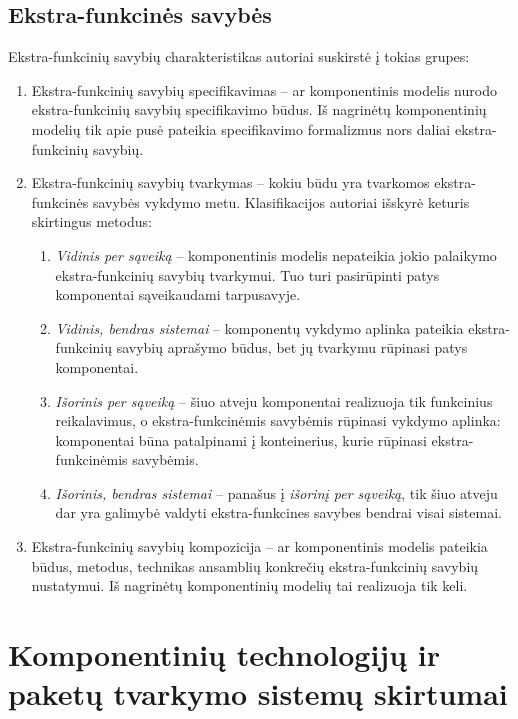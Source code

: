 \subsection{Ekstra-funkcinės savybės}

Ekstra-funkcinių savybių charakteristikas autoriai suskirstė į tokias
grupes:
\begin{enumerate}
  \item Ekstra-funkcinių savybių specifikavimas – ar komponentinis
    modelis nurodo ekstra-funkcinių savybių specifikavimo būdus.
    Iš nagrinėtų komponentinių modelių tik apie pusė pateikia
    specifikavimo formalizmus nors daliai ekstra-funkcinių savybių.
  \item Ekstra-funkcinių savybių tvarkymas – kokiu būdu yra tvarkomos
    ekstra-funkcinės savybės vykdymo metu. Klasifikacijos autoriai
    išskyrė keturis skirtingus metodus:
    \begin{enumerate}
      \item \emph{Vidinis per sąveiką} 
        – komponentinis modelis nepateikia jokio palaikymo
        ekstra-funkcinių savybių tvarkymui. Tuo turi pasirūpinti
        patys komponentai sąveikaudami tarpusavyje.
      \item \emph{Vidinis, bendras sistemai} 
        – komponentų vykdymo aplinka pateikia ekstra-funkcinių
        savybių aprašymo būdus, bet jų tvarkymu rūpinasi patys
        komponentai.
      \item \emph{Išorinis per sąveiką} 
        – šiuo atveju komponentai realizuoja tik funkcinius reikalavimus,
        o ekstra-funkcinėmis savybėmis rūpinasi vykdymo aplinka:
        komponentai būna patalpinami į konteinerius, kurie rūpinasi
        ekstra-funkcinėmis savybėmis.
      \item \emph{Išorinis, bendras sistemai} 
        – panašus į \emph{išorinį per sąveiką}, tik šiuo atveju dar
        yra galimybė valdyti ekstra-funkcines savybes bendrai visai
        sistemai.
    \end{enumerate}
  \item Ekstra-funkcinių savybių kompozicija – ar komponentinis modelis
    pateikia būdus, metodus, technikas ansamblių konkrečių ekstra-funkcinių
    savybių nustatymui. Iš nagrinėtų komponentinių modelių tai realizuoja
    tik keli.
\end{enumerate}

\section{Komponentinių technologijų ir paketų tvarkymo sistemų skirtumai}

